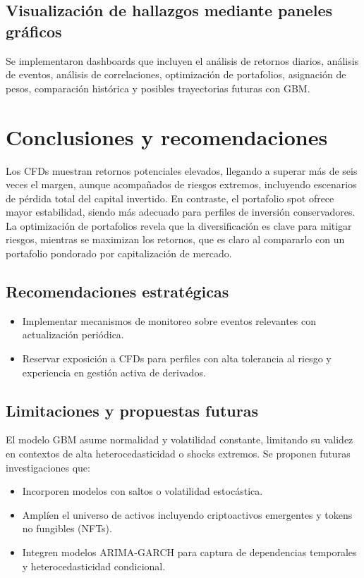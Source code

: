 \documentclass[12pt,letterpaper]{article}   %
\begin{document}
\subsection{Visualización de hallazgos mediante paneles gráficos}
Se implementaron dashboards que incluyen el análisis de retornos diarios, análisis de eventos, análisis de correlaciones, optimización de portafolios, asignación de pesos, comparación histórica y posibles trayectorias futuras con GBM.


\section{Conclusiones y recomendaciones}

Los CFDs muestran retornos potenciales elevados, llegando a superar más de seis veces el margen, aunque acompañados de riesgos extremos, incluyendo escenarios de pérdida total del capital invertido. En contraste, el portafolio spot ofrece mayor estabilidad, siendo más adecuado para perfiles de inversión conservadores. La optimización de portafolios revela que la diversificación es clave para mitigar riesgos, mientras se maximizan los retornos, que es claro al compararlo con un portafolio pondorado por capitalización de mercado. 

\subsection{Recomendaciones estratégicas}
\begin{itemize}
\item Implementar mecanismos de monitoreo sobre eventos relevantes con actualización periódica.
\item Reservar exposición a CFDs para perfiles con alta tolerancia al riesgo y experiencia en gestión activa de derivados.
\end{itemize}

\subsection{Limitaciones y propuestas futuras}
El modelo GBM asume normalidad y volatilidad constante, limitando su validez en contextos de alta heterocedasticidad o shocks extremos. Se proponen futuras investigaciones que:
\begin{itemize}
\item Incorporen modelos con saltos o volatilidad estocástica.
\item Amplíen el universo de activos incluyendo criptoactivos emergentes y tokens no fungibles (NFTs).
\item Integren modelos ARIMA-GARCH para captura de dependencias temporales y heterocedasticidad condicional.
\end{itemize}
\end{document}
